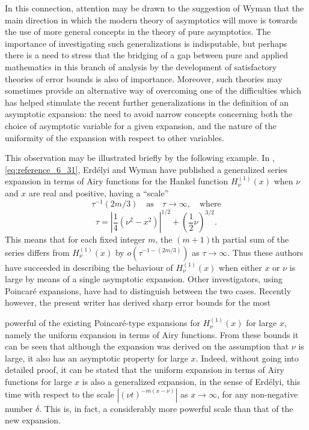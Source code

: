 \documentclass{article}
\begin{document}
In this connection, attention may be drawn to the suggestion of Wyman
{\cite{wyman}} that the main direction in which the modern theory of
asymptotics will move is towards the use of more general concepts in the
theory of pure asymptotics. The importance of investigating such
generalizations is indisputable, but perhaps there is a need to stress that
the bridging of a gap between pure and applied mathematics in this branch of
analysis by the development of satisfactory theories of error bounds is also
of importance. Moreover, such theories may sometimes provide an alternative
way of overcoming one of the difficulties which has helped stimulate the
recent further generalizations {\cite{reference6}} in the definition of an
asymptotic expansion: the need to avoid narrow concepts concerning both the
choice of asymptotic variable for a given expansion, and the nature of the
uniformity of the expansion with respect to other variables.

This observation may be illustrated briefly by the following example. In
{\cite{reference17}}, \eqref{eq:reference_6_31}, Erd{\'e}lyi and Wyman have
published a generalized series expansion in terms of Airy functions for the
Hankel function $H_{\nu}^{(1)} (x)$ when $\nu$ and $x$ are real and positive,
having a ``scale''
\begin{equation}
  \label{eq:scale_function} \tau^{- 1}  (2 m / 3)  \quad \text{as} \quad \tau
  \to \infty, \quad \text{where}
\end{equation}
\begin{equation}
  \label{eq:tau_definition} \tau = | \frac{1}{4} (\nu^2 - x^2) |^{1 / 2} +
  (\frac{1}{2} \nu)^{3 / 2} .
\end{equation}
This means that for each fixed integer $m$, the $(m + 1)$th partial sum of the
series differs from $H_{\nu}^{(1)} (x)$ by $o (\tau^{- 1 - (2 m / 3)})$ as
$\tau \to \infty$. Thus these authors have succeeded in describing the
behaviour of $H_{\nu}^{(1)} (x)$ when either $x$ or $\nu$ is large by means of
a single asymptotic expansion. Other investigators, using Poincar{\'e}
expansions, have had to distinguish between the two cases. Recently however,
the present writer {\cite{present_writer}} has derived sharp error bounds for
the most

powerful of the existing Poincar{\'e}-type expansions for $H_{\nu}^{(1)} (x)$
for large $x$, namely the uniform expansion in terms of Airy functions. From
these bounds it can be seen that although the expansion was derived on the
assumption that $\nu$ is large, it also has an asymptotic property for large
$x$. Indeed, without going into detailed proof, it can be stated that the
uniform expansion in terms of Airy functions for large $x$ is also a
generalized expansion, in the sense of Erd{\'e}lyi, this time with respect to
the scale $| (\nu t)^{- m (x - \nu)} |$ as $x \to \infty$, for any
non-negative number $\delta$. This is, in fact, a considerably more powerful
scale than that of the new expansion.
\end{document}
